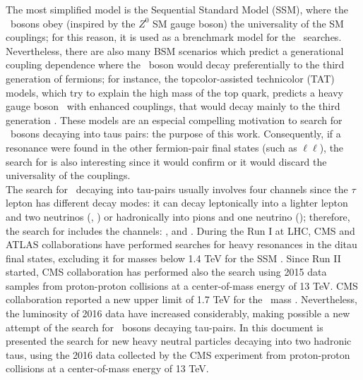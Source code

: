 The most simplified model is the Sequential Standard Model (SSM), where the \Zprime~bosons 
obey (inspired by the $Z^{0}$ SM gauge boson) the universality of the SM couplings; for this reason, 
it is used as a brenchmark model for the \Zprime~searches. Nevertheless, there are 
also many BSM scenarios which predict a generational coupling dependence where the \Zprime~boson 
would decay preferentially to the third generation of fermions; for instance, 
the topcolor-assisted technicolor (TAT) models, which try to explain the high mass of the top quark,
predicts a heavy gauge boson \ZprimeTAT~with enhanced couplings, that would decay mainly 
to the third generation \cite{Langacker:2008yv}. These models are an especial compelling motivation to 
search for \Zprime~bosons decaying into taus pairs: the purpose of this work. Consequently, if a resonance 
were found in the other fermion-pair final states (such as $\ell\ell$), the search for \Zprimetotautau is also 
interesting since it would confirm or it would discard the universality of the couplings. \\

The search for \Zprime~decaying into tau-pairs usually involves four channels since 
the $\tau$ lepton has different decay modes: it can decay leptonically into a lighter lepton and two 
neutrinos (\taue, \taumu) or hadronically into pions and one neutrino (\tauh); therefore, the 
search for \Zprimetotautau includes the channels: \tauell\tauh, \taue\taumu and \tauh\tauh. During the Run I at LHC, CMS and ATLAS 
collaborations have performed searches for heavy resonances in the ditau final states, excluding it
for masses below 1.4 TeV for the SSM \cite{CMSZprime2ditaubib,ATLASZprime2ditaubib}. Since Run II started, CMS 
collaboration has performed also the search using 2015 data samples from proton-proton collisions 
at a center-of-mass energy of 13 TeV. CMS collaboration reported a new upper limit of 1.7 TeV for the
\Zprime~mass \cite{CMS_Zprime2tays2015}. Nevertheless, the luminosity of 2016 data have increased considerably, making 
possible a new attempt of the search for \Zprime~bosons decaying tau-pairs. In this document is presented the search for new 
heavy neutral particles decaying into two hadronic taus, using the 2016 data collected by the CMS experiment
from proton-proton collisions at a center-of-mass energy of 13 TeV.\\


